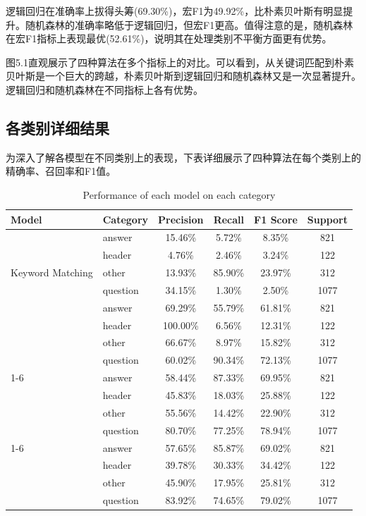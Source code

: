 \documentclass[12pt,a4paper]{article}
\begin{document}
逻辑回归在准确率上拔得头筹(69.30\%)，宏F1为49.92\%，比朴素贝叶斯有明显提升。随机森林的准确率略低于逻辑回归，但宏F1更高。值得注意的是，随机森林在宏F1指标上表现最优(52.61\%)，说明其在处理类别不平衡方面更有优势。

图5.1直观展示了四种算法在多个指标上的对比。可以看到，从关键词匹配到朴素贝叶斯是一个巨大的跨越，朴素贝叶斯到逻辑回归和随机森林又是一次显著提升。逻辑回归和随机森林在不同指标上各有优势。

\subsection{各类别详细结果}

为深入了解各模型在不同类别上的表现，下表详细展示了四种算法在每个类别上的精确率、召回率和F1值。

\begin{table}[H]
    \centering
    \caption{Performance of each model on each category}
    \begin{tabular}{llcccc}
        \toprule
        \textbf{Model} & \textbf{Category} & \textbf{Precision} & \textbf{Recall} & \textbf{F1 Score} & \textbf{Support} \\
        \midrule
        \multirow{5}{*}{Keyword Matching} & answer & 15.46\% & 5.72\% & 8.35\% & 821 \\
        & header & 4.76\% & 2.46\% & 3.24\% & 122 \\
        & other & 13.93\% & 85.90\% & 23.97\% & 312 \\
        & question & 34.15\% & 1.30\% & 2.50\% & 1077 \\
        \cmidrule(lr){1-6}
        \multirow{5}{*}{Naive Bayes} & answer & 69.29\% & 55.79\% & 61.81\% & 821 \\
        & header & 100.00\% & 6.56\% & 12.31\% & 122 \\
        & other & 66.67\% & 8.97\% & 15.82\% & 312 \\
        & question & 60.02\% & 90.34\% & 72.13\% & 1077 \\
        \cmidrule(lr){1-6}
        \multirow{5}{*}{Logistic Regression} & answer & 58.44\% & 87.33\% & 69.95\% & 821 \\
        & header & 45.83\% & 18.03\% & 25.88\% & 122 \\
        & other & 55.56\% & 14.42\% & 22.90\% & 312 \\
        & question & 80.70\% & 77.25\% & 78.94\% & 1077 \\
        \cmidrule(lr){1-6}
        \multirow{5}{*}{Random Forest} & answer & 57.65\% & 85.87\% & 69.02\% & 821 \\
        & header & 39.78\% & 30.33\% & 34.42\% & 122 \\
        & other & 45.90\% & 17.95\% & 25.81\% & 312 \\
        & question & 83.92\% & 74.65\% & 79.02\% & 1077 \\
        \bottomrule
    \end{tabular}
\end{table}
\end{document}

